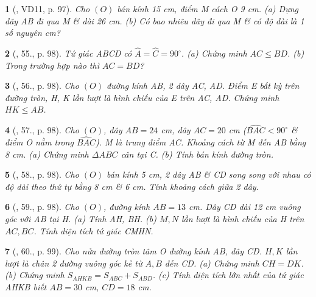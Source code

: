 \documentclass{article}
\newtheorem{baitoan}{}
\begin{document}
\begin{baitoan}[\cite{Binh_Toan_9_tap_1}, VD11, p. 97]
	Cho $(O)$ bán kính {\rm15 cm}, điểm M cách O {\rm9 cm}. (a) Dựng dây AB đi qua M \& dài {\rm26 cm}. (b) Có bao nhiêu dây đi qua M \& có độ dài là 1 số nguyên {\rm cm}?
\end{baitoan}

\begin{baitoan}[\cite{Binh_Toan_9_tap_1}, 55., p. 98]
	Tứ giác ABCD có $\widehat{A} = \widehat{C} = 90^\circ$. (a) Chứng minh $AC\le BD$. (b) Trong trường hợp nào thì $AC = BD$?
\end{baitoan}

\begin{baitoan}[\cite{Binh_Toan_9_tap_1}, 56., p. 98]
	Cho $(O)$ đường kính AB, 2 dây AC, AD. Điểm E bất kỳ trên đường tròn, H, K lần lượt là hình chiếu của E trên AC, AD. Chứng minh $HK\le AB$.
\end{baitoan}

\begin{baitoan}[\cite{Binh_Toan_9_tap_1}, 57., p. 98]
	Cho $(O)$, dây $AB = 24$ {\rm cm}, dây $AC = 20$ {\rm cm} ($\widehat{BAC} < 90^\circ$ \& điểm O nằm trong $\widehat{BAC}$). M là trung điểm AC. Khoảng cách từ M đến AB bằng {\rm8 cm}. (a) Chứng minh $\Delta ABC$ cân tại C. (b) Tính bán kính đường tròn.
\end{baitoan}

\begin{baitoan}[\cite{Binh_Toan_9_tap_1}, 58., p. 98]
	Cho $(O)$ bán kính {\rm5 cm}, 2 dây AB \& CD song song với nhau có độ dài theo thứ tự bằng {\rm8 cm} \& {\rm6 cm}. Tính khoảng cách giữa 2 dây.
\end{baitoan}

\begin{baitoan}[\cite{Binh_Toan_9_tap_1}, 59., p. 98]
	Cho $(O)$, đường kính $AB = 13$ {\rm cm}. Dây CD dài {\rm 12 cm} vuông góc với AB tại H. (a) Tính AH, BH. (b) $M,N$ lần lượt là hình chiếu của H trên $AC,BC$. Tính diện tích tứ giác CMHN.
\end{baitoan}

\begin{baitoan}[\cite{Binh_Toan_9_tap_1}, 60., p. 99]
	Cho nửa đường tròn tâm O đường kính AB, dây CD. $H,K$ lần lượt là chân 2 đường vuông góc kẻ từ $A,B$ đến CD. (a) Chứng minh $CH = DK$. (b) Chứng minh $S_{AHKB} = S_{ABC} + S_{ABD}$. (c) Tính diện tích lớn nhất của tứ giác AHKB biết $AB = 30$ {\rm cm}, $CD = 18$ {\rm cm}.
\end{baitoan}
\end{document}
